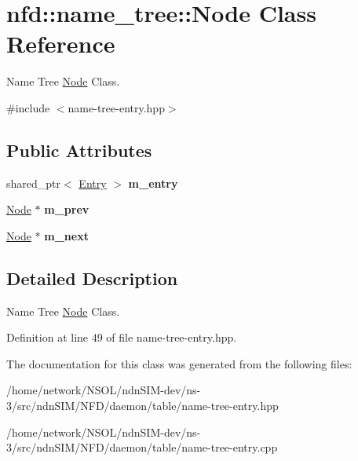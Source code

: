 \hypertarget{classnfd_1_1name__tree_1_1Node}{}\section{nfd\+:\+:name\+\_\+tree\+:\+:Node Class Reference}
\label{classnfd_1_1name__tree_1_1Node}


Name Tree \hyperlink{classnfd_1_1name__tree_1_1Node}{Node} Class.  




{\ttfamily \#include $<$name-\/tree-\/entry.\+hpp$>$}

\subsection*{Public Attributes}
\begin{DoxyCompactItemize}
\item 
shared\+\_\+ptr$<$ \hyperlink{classnfd_1_1name__tree_1_1Entry}{Entry} $>$ {\bfseries m\+\_\+entry}\hypertarget{classnfd_1_1name__tree_1_1Node_ac216e92ad93d0d9064a36c5b081c16d6}{}\label{classnfd_1_1name__tree_1_1Node_ac216e92ad93d0d9064a36c5b081c16d6}

\item 
\hyperlink{classnfd_1_1name__tree_1_1Node}{Node} $\ast$ {\bfseries m\+\_\+prev}\hypertarget{classnfd_1_1name__tree_1_1Node_aa5e35418e11c60c459f98d9d536da8bc}{}\label{classnfd_1_1name__tree_1_1Node_aa5e35418e11c60c459f98d9d536da8bc}

\item 
\hyperlink{classnfd_1_1name__tree_1_1Node}{Node} $\ast$ {\bfseries m\+\_\+next}\hypertarget{classnfd_1_1name__tree_1_1Node_aca5e093dba7f465806cbb5f84275e854}{}\label{classnfd_1_1name__tree_1_1Node_aca5e093dba7f465806cbb5f84275e854}

\end{DoxyCompactItemize}


\subsection{Detailed Description}
Name Tree \hyperlink{classnfd_1_1name__tree_1_1Node}{Node} Class. 

Definition at line 49 of file name-\/tree-\/entry.\+hpp.



The documentation for this class was generated from the following files\+:\begin{DoxyCompactItemize}
\item 
/home/network/\+N\+S\+O\+L/ndn\+S\+I\+M-\/dev/ns-\/3/src/ndn\+S\+I\+M/\+N\+F\+D/daemon/table/name-\/tree-\/entry.\+hpp\item 
/home/network/\+N\+S\+O\+L/ndn\+S\+I\+M-\/dev/ns-\/3/src/ndn\+S\+I\+M/\+N\+F\+D/daemon/table/name-\/tree-\/entry.\+cpp\end{DoxyCompactItemize}
